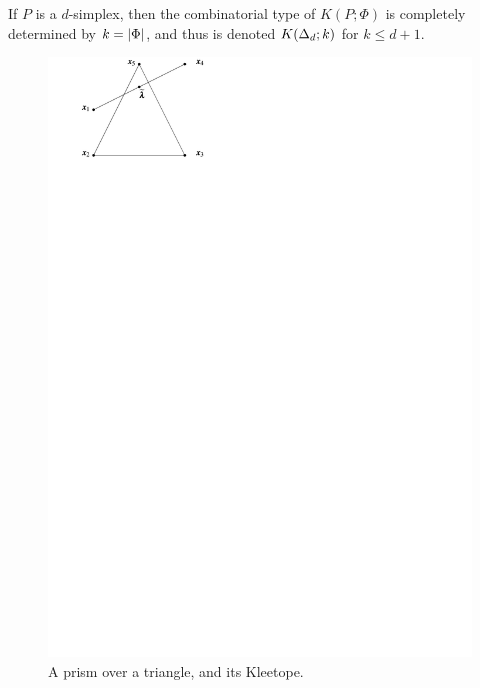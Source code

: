         If \(P\) is a \(d\)-simplex, then the combinatorial type of \(K(P;\Phi)\) is completely determined by \(k=\left\lvert\Phi\right\rvert\), and thus is denoted \(K(\Delta_{d};k)\) for \(k\le d+1\).

        \begin{center}
            \begin{figure}[h!bt]
                \includegraphics[page=26, width=.6\textwidth]{pictures.pdf}
                \caption{A prism over a triangle, and its Kleetope.\label{Fig:Klee}}
            \end{figure}
        \end{center}

